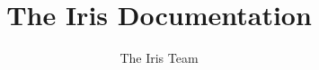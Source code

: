 \documentclass[10pt]{article}
\begin{document}
\title{\bfseries The Iris Documentation}
\author{The Iris Team}
\maketitle

\thispagestyle{empty}

\tableofcontents

\clearpage\begingroup

\endgroup\clearpage\begingroup

%
%
%
\printbibliography
\endgroup
\end{document}
